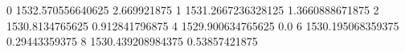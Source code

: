0 1532.570556640625 2.669921875
1 1531.2667236328125 1.3660888671875
2 1530.8134765625 0.912841796875
4 1529.900634765625 0.0
6 1530.195068359375 0.29443359375
8 1530.439208984375 0.53857421875
